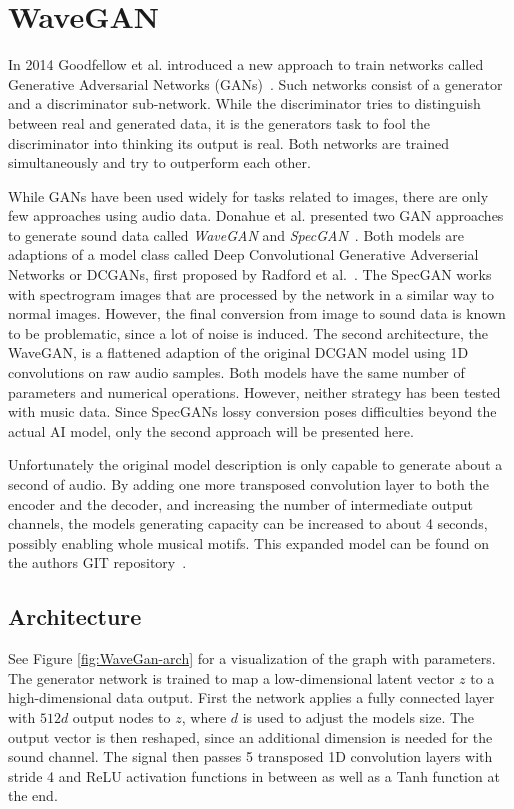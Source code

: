 \documentclass[12pt]{article}
\begin{document}
\section{WaveGAN}
In 2014 Goodfellow et al. introduced a new approach to train networks called Generative Adversarial Networks (GANs)~\cite{goodfellow2014generative}.
Such networks consist of a generator and a discriminator sub-network.
While the discriminator tries to distinguish between real and generated data, it is the generators task to fool the discriminator into thinking its output is real.
Both networks are trained simultaneously and try to outperform each other.

While GANs have been used widely for tasks related to images, there are only few approaches using audio data.
Donahue et al. presented two GAN approaches to generate sound data called \emph{WaveGAN} and \emph{SpecGAN}~\cite{donahue2018adversarial}.
Both models are adaptions of a model class called Deep Convolutional Generative Adverserial Networks or DCGANs, first proposed by Radford et al.~\cite{radford2015unsupervised}.
The SpecGAN works with spectrogram images that are processed by the network in a similar way to normal images.
However, the final conversion from image to sound data is known to be problematic, since a lot of noise is induced.
The second architecture, the WaveGAN, is a flattened adaption of the original DCGAN model using 1D convolutions on raw audio samples.
Both models have the same number of parameters and numerical operations.
However, neither strategy has been tested with music data.
Since SpecGANs lossy conversion poses difficulties beyond the actual AI model, only the second approach will be presented here.

Unfortunately the original model description is only capable to generate about a second of audio.
By adding one more transposed convolution layer to both the encoder and the decoder, and increasing the number of intermediate output channels, the models generating capacity can be increased to about 4 seconds, possibly enabling whole musical motifs. 
This expanded model can be found on the authors GIT repository~\cite{donahue2019wavegan}.



\subsection{Architecture}
See Figure \ref{fig:WaveGan-arch} for a visualization of the graph with parameters.
The generator network is trained to map a low-dimensional latent vector $z$ to a high-dimensional data output.
First the network applies a fully connected layer with $512d$ output nodes to $z$, where $d$ is used to adjust the models size.
The output vector is then reshaped, since an additional dimension is needed for the sound channel.
The signal then passes 5 transposed 1D convolution layers with stride 4 and ReLU activation functions in between as well as a Tanh function at the end.
\end{document}
